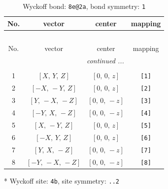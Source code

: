 \documentclass[fleqn,8pt]{jsarticle}
\begin{document}
\renewcommand{\arraystretch}{1.2}
\begin{longtable}{cccc}
\caption{Wyckoff bond: {\tt 8e@2a}, bond symmetry: {\tt 1}}
 \\
 \hline \hline
No. & vector & center & mapping \\ \hline \endfirsthead

\multicolumn{3}{l}{\tablename\ \thetable{}} \\
 \hline \hline
No. & vector & center & mapping \\ \hline \endhead

 \hline \hline
\multicolumn{3}{r}{\footnotesize\it continued ...} \\ \endfoot

 \hline \hline
\multicolumn{3}{r}{} \\ \endlastfoot

1 & $\left[ X,\, Y,\, Z \right]$ & $\left[ 0,\, 0,\, z \right]$ & {\tt [1]} \\ \hline
2 & $\left[ - X,\, - Y,\, Z \right]$ & $\left[ 0,\, 0,\, z \right]$ & {\tt [2]} \\ \hline
3 & $\left[ Y,\, - X,\, - Z \right]$ & $\left[ 0,\, 0,\, - z \right]$ & {\tt [3]} \\ \hline
4 & $\left[ - Y,\, X,\, - Z \right]$ & $\left[ 0,\, 0,\, - z \right]$ & {\tt [4]} \\ \hline
5 & $\left[ X,\, - Y,\, Z \right]$ & $\left[ 0,\, 0,\, z \right]$ & {\tt [5]} \\ \hline
6 & $\left[ - X,\, Y,\, Z \right]$ & $\left[ 0,\, 0,\, z \right]$ & {\tt [6]} \\ \hline
7 & $\left[ Y,\, X,\, - Z \right]$ & $\left[ 0,\, 0,\, - z \right]$ & {\tt [7]} \\ \hline
8 & $\left[ - Y,\, - X,\, - Z \right]$ & $\left[ 0,\, 0,\, - z \right]$ & {\tt [8]} \\
\end{longtable}
* Wyckoff site: {\tt 4b}, site symmetry: {\tt ..2}
\renewcommand{\arraystretch}{1.2}
\end{document}
